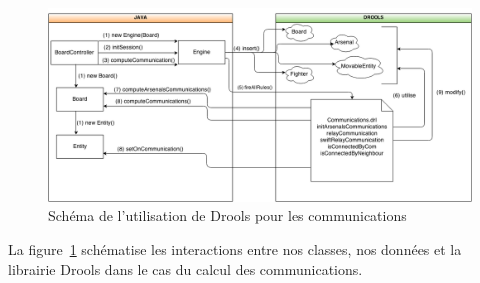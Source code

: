 		

			\begin{figure}[!h]
			    \caption{Schéma de l'utilisation de Drools pour les communications}
			    \centerline{\includegraphics[scale=0.5]{images/architecture/drools_schema_use_communications.png}}
			    \label{fig:drools_communication}
			\end{figure}

			La figure~\ref{fig:drools_communication} schématise les interactions entre nos classes, nos données et la librairie Drools dans le cas du calcul des communications.

			

